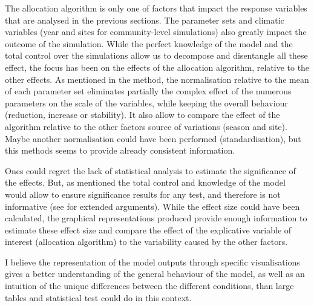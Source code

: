 The allocation algorithm is only one of factors that impact the response variables that are analysed in the previous sections. The parameter sets and climatic variables (year and sites for community-level simulations) also greatly impact the outcome of the simulation. While the perfect knowledge of the model and the total control over the simulations allow us to decompose and disentangle all these effect, the focus has been on the effects of the allocation algorithm, relative to the other effects. As mentioned in the method, the normalisation relative to the mean of each parameter set eliminates partially the complex effect of the numerous parameters on the scale of the variables, while keeping the overall behaviour (reduction, increase or stability). It also allow to compare the effect of the algorithm relative to the other factors source of variations (season and site). Maybe another normalisation could have been performed (standardisation), but this methods seems to provide already consistent information.

Ones could regret the lack of statistical analysis to estimate the significance of the effects. But, as mentioned the total control and knowledge of the model would allow to ensure significance results for any test, and therefore is not informative (see \citet{white_ecologists_2014} for extended arguments). While the effect size could have been calculated, the graphical representations produced provide enough information to estimate these effect size and compare the effect of the explicative variable of interest (allocation algorithm) to the variability caused by the other factors. 

I believe the representation of the model outputs through specific visualisations gives a better understanding of the general behaviour of the model, as well as an intuition of the unique differences between the different conditions, than large tables and statistical test could do in this context. 




